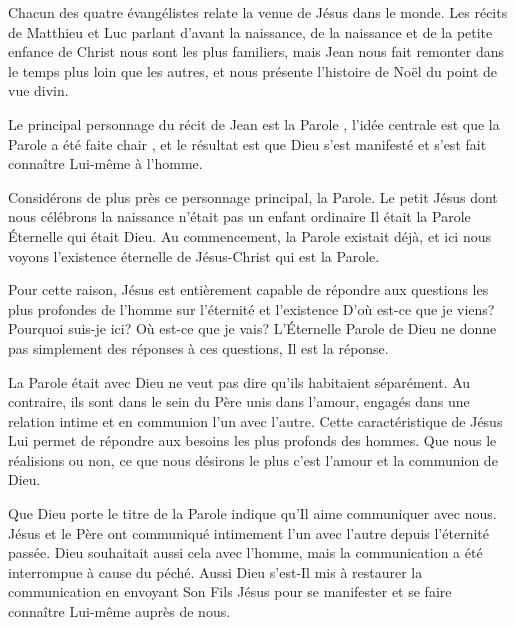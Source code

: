 

Chacun des quatre évangélistes relate la venue de Jésus dans le monde. Les récits de Matthieu et Luc parlant d'avant la naissance, de la naissance et de la petite enfance de Christ nous sont les plus familiers, mais Jean nous fait remonter dans le temps plus loin que les autres, et nous présente l'histoire de Noël du point de vue divin.

Le principal personnage du récit de Jean est \og la Parole \fg{}, l'idée centrale est que \og la Parole a été faite chair \fg{}, et le résultat est que Dieu s'est manifesté et s'est fait connaître Lui-même à l'homme.

Considérons de plus près ce personnage principal, la Parole. Le petit Jésus dont nous célébrons la naissance n'était pas un enfant ordinaire \ocadr Il était la Parole Éternelle qui était Dieu. Au commencement, la Parole existait déjà, et ici nous voyons l'existence éternelle de Jésus-Christ qui est la Parole.

Pour cette raison, Jésus est entièrement capable de répondre aux questions les plus profondes de l'homme sur l'éternité et l'existence\frcolon{} D'où est-ce que je viens? Pourquoi suis-je ici? Où est-ce que je vais? L'Éternelle Parole de Dieu ne donne pas simplement des réponses à ces questions, Il est la réponse.

\og La Parole était avec Dieu \fg{} ne veut pas dire qu'ils habitaient séparément. Au contraire, ils sont dans le sein du Père \ocadr unis dans l'amour, engagés dans une relation intime et en communion l'un avec l'autre. Cette caractéristique de Jésus Lui permet de répondre aux besoins les plus profonds des hommes. Que nous le réalisions ou non, ce que nous désirons le plus c'est l'amour et la communion de Dieu.

Que Dieu porte le titre de \og la Parole \fg{} indique qu'Il aime communiquer avec nous. Jésus et le Père ont communiqué intimement l'un avec l'autre depuis l'éternité passée. Dieu souhaitait aussi cela avec l'homme, mais la communication a été interrompue à cause du péché. Aussi Dieu s'est-Il mis à restaurer la communication en envoyant Son Fils Jésus pour se manifester et se faire connaître Lui-même auprès de nous.


